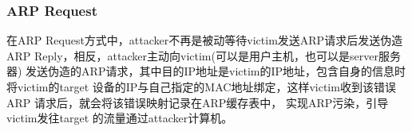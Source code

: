 \subsubsection{ARP Request}
在ARP Request方式中，attacker不再是被动等待victim发送ARP请求后发送伪造ARP Reply，相反，attacker主动向victim(可以是用户主机，也可以是server服务器)
发送伪造的ARP请求，其中目的IP地址是victim的IP地址，包含自身的信息时将victim的target 设备的IP与自己指定的MAC地址绑定，这样victim收到该错误ARP 请求后，就会将该错误映射记录在ARP缓存表中，
实现ARP污染，引导victim发往target 的流量通过attacker计算机。